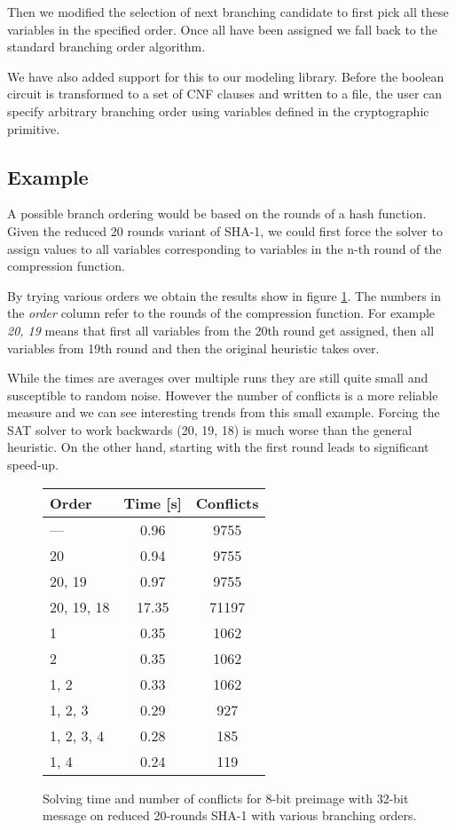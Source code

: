 Then we modified the selection of next branching candidate to first pick all these variables in the specified order.
Once all have been assigned we fall back to the standard branching order algorithm.

We have also added support for this to our modeling library.
Before the boolean circuit is transformed to a set of CNF clauses and written to a file, the user can specify arbitrary branching order using variables defined in the cryptographic primitive.

\subsection{Example}
A possible branch ordering would be based on the rounds of a hash function.
Given the reduced 20 rounds variant of SHA-1, we could first force the solver to assign values to all variables corresponding to variables in the n-th round of the compression function.

By trying various orders we obtain the results show in figure \ref{fig:opt-branchorder-example-sha1}.
The numbers in the \emph{order} column refer to the rounds of the compression function.
For example \emph{20, 19} means that first all variables from the 20th round get assigned, then all variables from 19th round and then the original heuristic takes over.

While the times are averages over multiple runs they are still quite small and susceptible to random noise.
However the number of conflicts is a more reliable measure and we can see interesting trends from this small example.
Forcing the SAT solver to work backwards (20, 19, 18) is much worse than the general heuristic.
On the other hand, starting with the first round leads to significant speed-up.

\begin{figure}
\caption{Solving time and number of conflicts for 8-bit preimage with 32-bit message on reduced 20-rounds SHA-1 with various branching orders.}
\label{fig:opt-branchorder-example-sha1}
\begin{tabular}{l|c|c}
Order & Time [s] & Conflicts \\ \hline
--- & 0.96 & 9755 \\ \hline
20 & 0.94 & 9755 \\
20, 19 & 0.97 & 9755 \\
20, 19, 18 & 17.35 & 71197 \\ \hline
1 & 0.35 & 1062 \\
2 & 0.35 & 1062 \\
1, 2 & 0.33 & 1062 \\
1, 2, 3 & 0.29 & 927 \\
1, 2, 3, 4 & 0.28 & 185 \\
1, 4 & 0.24 & 119
\end{tabular}
\end{figure}

